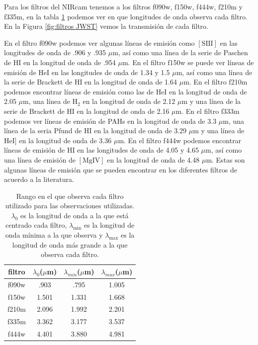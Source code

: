 \documentclass{book}
\begin{document}
Para los filtros del NIRcam tenemos a los filtros f090w, f150w, f444w,
f210m y f335m, en la tabla \ref{tab:filtros} podemos ver en que
longitudes de onda observa cada filtro. En la Figura \ref{fig:filtros
  JWST} vemos la transmisión de cada filtro.

En el filtro f090w podemos ver algunas líneas de emisión como
$[\mathrm{S \scriptstyle{III}}]$ en las longitudes de onda de .906 y
.935 $\mu$m, así como una línea de la serie de Paschen de
$\mathrm{H\scriptstyle{I}}$ en la longitud de onda de .954 $\mu$m. En el
filtro f150w se puede ver líneas de emisión de
$\mathrm{He\scriptstyle{I}}$ en las longitudes de onda de 1.34 y 1.5
$\mu$m, así como una línea de la serie de Brackett de
$\mathrm{H\scriptstyle{I}}$ en la longitud de onda de 1.64 $\mu$m. En el
filtro f210m podemos encontrar líneas de emisión como las de
$\mathrm{He\scriptstyle{I}}$ en la longitud de onda de 2.05 $\mu$m, una
línea de $\mathrm{H_2}$ en la longitud de onda de 2.12 $\mu$m y una
línea de la serie de Brackett de $\mathrm{H\scriptstyle{I}}$ en la
longitud de onda de 2.16 $\mu$m. En el filtro f333m podemos ver líneas
de emisión de PAHs en la longitud de onda de 3.3 $\mu$m, una línea de la
seria Pfund de $\mathrm{H\scriptstyle{I}}$ en la longitud de onda de
3.29 $\mu$m y una línea de $\mathrm{He\scriptstyle{I}}]$ en la longitud
de onda de 3.36 $\mu$m. En el filtro f444w podemos encontrar líneas de
emisión de $\mathrm{H\scriptstyle{I}}$ en las longitudes de onda de
4.05 y 4.65 $\mu$m, así como una línea de emisión de
$[\mathrm{Mg\scriptstyle{IV}}]$ en la longitud de onda de 4.48 $\mu$m.
Estas son algunas líneas de emisión que se pueden encontrar en los
diferentes filtros de acuerdo a la literatura.

\begin{table}[htb]
    \centering
    \begin{tabular}{c c c c}
        \toprule
        filtro & $\lambda_0$($\mu$m) & $\lambda_{min}$($\mu$m) & $\lambda_{max}$($\mu$m) \\ 
        \midrule
         f090w & .903 & .795 & 1.005\\
         f150w &1.501 &1.331 & 1.668\\
         f210m &2.096 &1.992 & 2.201\\
         f335m &3.362 &3.177 & 3.537\\
         f444w &4.401 &3.880 & 4.981\\
         \bottomrule
    \end{tabular}
    \caption{Rango en el que observa cada filtro utilizado para las
      observaciones utilizadas. $\lambda_0$ es la longitud de onda a la que
      está centrado cada filtro, $\lambda_\mathrm{min}$ es la longitud de
      onda mínima a la que observa y $\lambda _\mathrm{max}$ es la longitud
      de onda más grande a la que observa cada filtro.}
    \label{tab:filtros}
\end{table}
\end{document}
